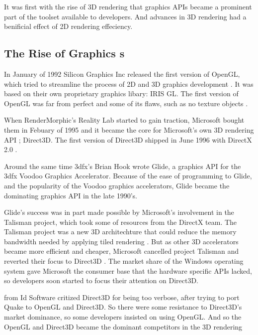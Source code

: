 It was first with the rise of 3D rendering that graphics \glspl{API} became a prominent part of the toolset available to developers.
And advances in 3D rendering had a benificial effect of 2D rendering effeciency.


\subsection{The Rise of Graphics s} 

In January of 1992 Silicon Graphics Inc released the first version of OpenGL, which tried to streamline the process of 2D and 3D graphics development \cite{segal1994opengl}.
It was based on their own proprietary graphics libary: \gls{IRIS GL}.
The first version of OpenGL was far from perfect and some of its flaws, such as no texture objects \cite{kronos????history}.

When RenderMorphic's Reality Lab started to gain traction, Microsoft bought them in Febuary of 1995 and it became the core for Microsoft's own 3D rendering \gls{API} \cite{1997crushed}; Direct3D.
The first version of Direct3D shipped in June 1996 with DirectX 2.0 \cite{wikipedia????directx}. 

Around the same time 3dfx's Brian Hook wrote Glide, a graphics API for the 3dfx Voodoo Graphics Accelerator.
Because of the ease of programming to Glide, and the popularity of the Voodoo graphics accelerators, Glide became the dominating graphics \gls{API} in the late 1990's.

Glide's success was in part made possible by Microsoft's involvement in the Talisman project, which took some of resources from the DirectX team.
The Talisman project was a new 3D architechture that could reduce the memory bandwidth needed by applying tiled rendering \cite{torborg1996talisman}.
But as other 3D accelerators became more efficient and cheaper, Microsoft cancelled project Talisman and reverted their focus to Direct3D \cite{wikipedia????talisman}.
The market share of the Windows operating system gave Microsoft the consumer base that the hardware specific \glspl{API} lacked, so  developers soon started to focus their attention on Direct3D.

\citet{carmack1996plan} from Id Software critized Direct3D for being too verbose, after trying to port Quake to OpenGL and Direct3D.
So there were some resistance to Direct3D's market dominance, so some developers insisted on using OpenGL.
And so the OpenGL and Direct3D became the dominant competitors in the 3D rendering 

